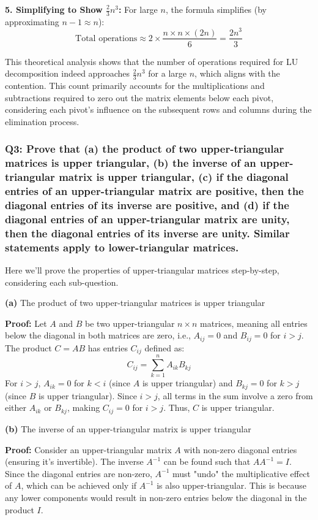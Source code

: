 \documentclass{article}
\begin{document}
\textbf{5. Simplifying to Show \(\frac{2}{3} n^3\):}
   For large \(n\), the formula simplifies (by approximating \(n-1 \approx n\)):
   \[
   \text{Total operations} \approx 2 \times \frac{n \times n \times (2n)}{6} = \frac{2n^3}{3}
   \]

This theoretical analysis shows that the number of operations required for LU decomposition indeed approaches \(\frac{2}{3} n^3\) for a large \(n\), which aligns with the contention. This count primarily accounts for the multiplications and subtractions required to zero out the matrix elements below each pivot, considering each pivot's influence on the subsequent rows and columns during the elimination process.

\subsubsection*{Q3: Prove that (a) the product of two upper-triangular matrices is upper triangular, (b) the inverse of an upper-triangular matrix is upper triangular, (c) if the diagonal entries of an upper-triangular matrix are positive, then the diagonal entries of its inverse are positive, and (d) if the diagonal entries of an upper-triangular matrix are unity, then the diagonal entries of its inverse are unity. Similar statements apply to lower-triangular matrices.}

Here we'll prove the properties of upper-triangular matrices step-by-step, considering each sub-question.

\textbf{(a)} The product of two upper-triangular matrices is upper triangular

\textbf{Proof:}
Let \( A \) and \( B \) be two upper-triangular \( n \times n \) matrices, meaning all entries below the diagonal in both matrices are zero, i.e., \( A_{ij} = 0 \) and \( B_{ij} = 0 \) for \( i > j \). The product \( C = AB \) has entries \( C_{ij} \) defined as:
\[ C_{ij} = \sum_{k=1}^n A_{ik}B_{kj} \]
For \( i > j \), \( A_{ik} = 0 \) for \( k < i \) (since \( A \) is upper triangular) and \( B_{kj} = 0 \) for \( k > j \) (since \( B \) is upper triangular). Since \( i > j \), all terms in the sum involve a zero from either \( A_{ik} \) or \( B_{kj} \), making \( C_{ij} = 0 \) for \( i > j \). Thus, \( C \) is upper triangular.

\textbf{(b)} The inverse of an upper-triangular matrix is upper triangular

\textbf{Proof:}
Consider an upper-triangular matrix \( A \) with non-zero diagonal entries (ensuring it's invertible). The inverse \( A^{-1} \) can be found such that \( AA^{-1} = I \). Since the diagonal entries are non-zero, \( A^{-1} \) must "undo" the multiplicative effect of \( A \), which can be achieved only if \( A^{-1} \) is also upper-triangular. This is because any lower components would result in non-zero entries below the diagonal in the product \( I \).
\end{document}
